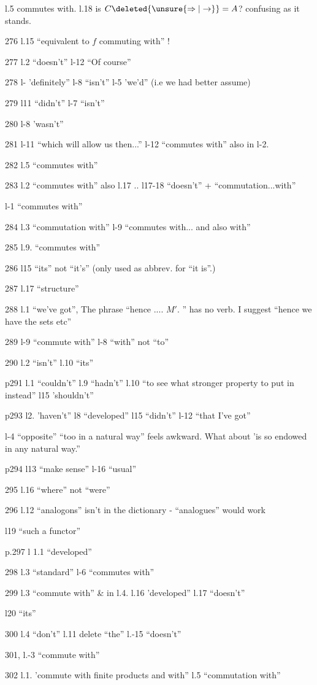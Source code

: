 
l.5 commutes with. l.18 is $C\deleted{\unsure{\Rightarrow|\to}}=A$? confusing as it stands.

276 l.15 ``equivalent to $f$ commuting with'' !

277 l.2 ``doesn't'' l-12 ``Of course''

278 l- 'definitely'' l-8 ``isn't'' l-5 'we'd'' (i.e we had better assume)

279 l11 ``didn't'' l-7 ``isn't''

280 l-8 'wasn't''

281 l-11 ``which will allow us then...'' l-12 ``commutes with'' also in l-2.

282 l.5 ``commutes with''

283 l.2 ``commutes with'' also l.17 .. l17-18 ``doesn't'' + ``commutation...with''

l-1 ``commutes with''

284 l.3 ``commutation with'' l-9 ``commutes with... and also with''

285 l.9. ``commutes with''

286 l15 ``its'' not ``it's'' (only used as abbrev. for ``it is''.)

287 l.17 ``structure''

288 l.1 ``we've got'', The phrase ``hence .... $M'$. ''  has no verb. I suggest ``hence we have the sets etc''

289 l-9 ``commute with'' l-8 ``with'' not ``to''

290 l.2 ``isn't'' l.10 ``its''

p291 l.1 ``couldn't'' l.9 ``hadn't'' l.10 ``to see what  stronger property to put in instead'' l15 'shouldn't''

p293 l2. 'haven't'' l8 ``developed'' l15 ``didn't'' l-12 ``that I've got''

l-4 ``opposite''  ``too in a natural way'' feels awkward. What about 'is so endowed in any natural way.''

p294 l13 ``make sense'' l-16 ``usual''

295 l.16 ``where'' not ``were''

296 l.12 ``analogons'' isn't in the dictionary - ``analogues'' would work

l19 ``such a functor''

p.297 l 1.1 ``developed''

298 l.3 ``standard'' l-6 ``commutes with''

299 l.3 ``commute with'' \& in l.4. l.16 'developed'' l.17 ``doesn't''

l20 ``its''

300 l.4 ``don't'' l.11 delete ``the'' l.-15 ``doesn't''

301, l.-3 ``commute with''

302 l.1. 'commute with  finite products and with'' l.5 ``commutation with''

